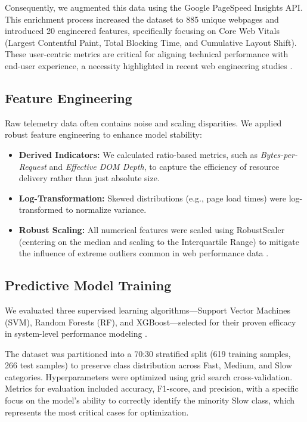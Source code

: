 \documentclass[sn-nature]{sn-jnl}
\begin{document}
Consequently, we augmented this data using the Google PageSpeed Insights API. This enrichment process increased the dataset to 885 unique webpages and introduced 20 engineered features, specifically focusing on Core Web Vitals (Largest Contentful Paint, Total Blocking Time, and Cumulative Layout Shift). These user-centric metrics are critical for aligning technical performance with end-user experience, a necessity highlighted in recent web engineering studies \cite{sehwag2024, vanriet2023}.

\subsection{Feature Engineering}

Raw telemetry data often contains noise and scaling disparities. We applied robust feature engineering to enhance model stability:
\begin{itemize}
    \item \textbf{Derived Indicators:} We calculated ratio-based metrics, such as \textit{Bytes-per-Request} and \textit{Effective DOM Depth}, to capture the efficiency of resource delivery rather than just absolute size.
    \item \textbf{Log-Transformation:} Skewed distributions (e.g., page load times) were log-transformed to normalize variance.
    \item \textbf{Robust Scaling:} All numerical features were scaled using RobustScaler (centering on the median and scaling to the Interquartile Range) to mitigate the influence of extreme outliers common in web performance data \cite{xin2023}.
\end{itemize}

\subsection{Predictive Model Training}

We evaluated three supervised learning algorithms—Support Vector Machines (SVM), Random Forests (RF), and XGBoost—selected for their proven efficacy in system-level performance modeling \cite{huang2023, dakic2025}.

The dataset was partitioned into a 70:30 stratified split (619 training samples, 266 test samples) to preserve class distribution across Fast, Medium, and Slow categories. Hyperparameters were optimized using grid search cross-validation. Metrics for evaluation included accuracy, F1-score, and precision, with a specific focus on the model's ability to correctly identify the minority Slow class, which represents the most critical cases for optimization.
\end{document}
